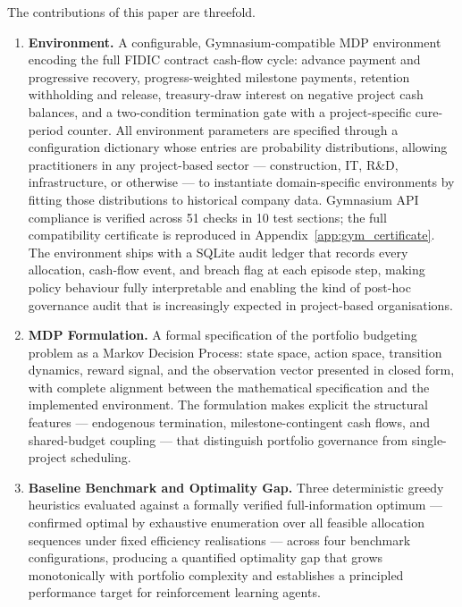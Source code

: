 The contributions of this paper are threefold.

\begin{enumerate}[leftmargin=*, label=\textbf{C\arabic*.}]

    \item \textbf{Environment.} A configurable, Gymnasium-compatible
    MDP environment encoding the full FIDIC contract cash-flow cycle:
    advance payment and progressive recovery, progress-weighted
    milestone payments, retention withholding and release,
    treasury-draw interest on negative project cash balances, and a
    two-condition termination gate with a project-specific cure-period
    counter. All environment parameters are specified through a
    configuration dictionary whose entries are probability distributions,
    allowing practitioners in any project-based sector --- construction,
    IT, R\&D, infrastructure, or otherwise --- to instantiate
    domain-specific environments by fitting those distributions to
    historical company data. Gymnasium API compliance is verified across
    51 checks in 10 test sections; the full compatibility certificate is
    reproduced in Appendix~\ref{app:gym_certificate}. The environment
    ships with a SQLite audit ledger that records every allocation,
    cash-flow event, and breach flag at each episode step, making policy
    behaviour fully interpretable and enabling the kind of post-hoc
    governance audit that is increasingly expected in project-based
    organisations.

    \item \textbf{MDP Formulation.} A formal specification of the
    portfolio budgeting problem as a Markov Decision Process: state
    space, action space, transition dynamics, reward signal, and the
    observation vector presented in closed form, with complete alignment
    between the mathematical specification and the implemented
    environment. The formulation makes explicit the structural features
    --- endogenous termination, milestone-contingent cash flows, and
    shared-budget coupling --- that distinguish portfolio governance from
    single-project scheduling.

    \item \textbf{Baseline Benchmark and Optimality Gap.} Three
    deterministic greedy heuristics evaluated against a formally verified
    full-information optimum --- confirmed optimal by exhaustive
    enumeration over all feasible allocation sequences under fixed
    efficiency realisations --- across four benchmark configurations,
    producing a quantified optimality gap that grows monotonically with
    portfolio complexity and establishes a principled performance target
    for reinforcement learning agents.

\end{enumerate}


